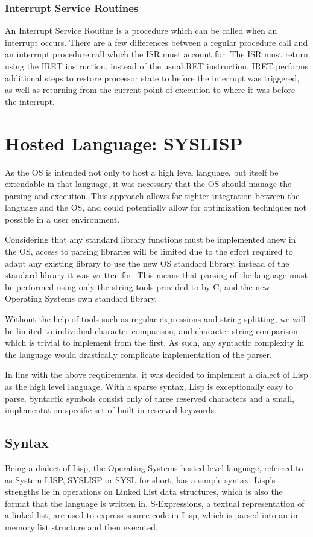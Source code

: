 \documentclass[10pt]{report}
\begin{document}
\subsubsection{Interrupt Service Routines}
An Interrupt Service Routine is a procedure which can be called when an interrupt occurs. There are a few differences between a regular procedure call and an interrupt procedure call which the ISR must account for. The ISR must return using the IRET instruction\cite{guide2011intel}, instead of the usual RET instruction. IRET performs additional steps to restore processor state to before the interrupt was triggered, as well as returning from the current point of execution to where it was before the interrupt.

\section{Hosted Language: SYSLISP}
As the OS is intended not only to host a high level language, but itself be extendable in that language, it was necessary that the OS should manage the parsing and execution. This approach allows for tighter integration between the language and the OS, and could potentially allow for optimization techniques not possible in a user environment.

Considering that any standard library functions must be implemented anew in the OS, access to parsing libraries will be limited due to the effort required to adapt any existing library to use the new OS standard library, instead of the standard library it was written for. This means that parsing of the language must be performed using only the string tools provided to by C, and the new Operating Systems own standard library.

Without the help of tools such as regular expressions and string splitting, we will be limited to individual character comparison, and character string comparison which is trivial to implement from the first. As such, any syntactic complexity in the language would drastically complicate implementation of the parser.

In line with the above requirements, it was decided to implement a dialect of Lisp as the high level language. With a sparse syntax, Lisp is exceptionally easy to parse. Syntactic symbols consist only of three reserved characters and a small, implementation specific set of built-in reserved keywords\cite{MccarthyJohn1960Rfos}.

\subsection{Syntax}
Being a dialect of Lisp, the Operating Systems hosted level language, referred to as System LISP, SYSLISP or SYSL for short, has a simple syntax. Lisp's strengths lie in operations on Linked List data structures, which is also the format that the language is written in. S-Expressions, a textual representation of a linked list, are used to express source code in Lisp, which is parsed into an in-memory list structure and then executed.
\end{document}
